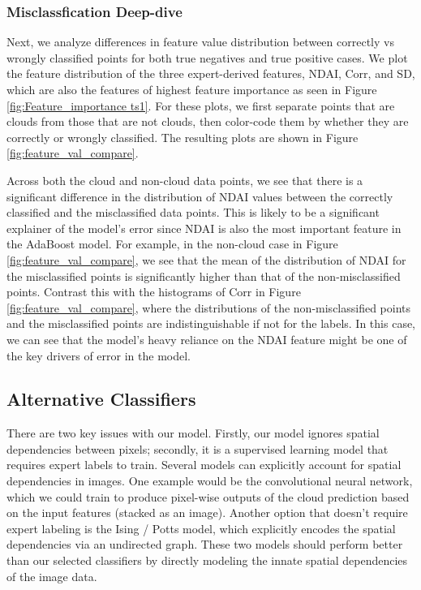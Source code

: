 \documentclass[11pt, letterpaper, journal]{IEEEtran}
\begin{document}
\subsubsection{Misclassfication Deep-dive}
Next, we analyze differences in feature value distribution between correctly vs wrongly classified points for both true negatives and true positive cases. We plot the feature distribution of the three expert-derived features, NDAI, Corr, and SD, which are also the features of highest feature importance as seen in Figure \ref{fig:Feature_importance ts1}. For these plots, we first separate points that are clouds from those that are not clouds, then color-code them by whether they are correctly or wrongly classified. The resulting plots are shown in Figure \ref{fig:feature_val_compare}.

Across both the cloud and non-cloud data points, we see that there is a significant difference in the distribution of NDAI values between the correctly classified and the misclassified data points. This is likely to be a significant explainer of the model's error since NDAI is also the most important feature in the AdaBoost model. For example, in the non-cloud case in Figure \ref{fig:feature_val_compare}, we see that the mean of the distribution of NDAI for the misclassified points is significantly higher than that of the non-misclassified points. Contrast this with the histograms of Corr in Figure \ref{fig:feature_val_compare}, where the distributions of the non-misclassified points and the misclassified points are indistinguishable if not for the labels. In this case, we can see that the model's heavy reliance on the NDAI feature might be one of the key drivers of error in the model.

\subsection{Alternative Classifiers}
There are two key issues with our model. Firstly, our model ignores spatial dependencies between pixels; secondly, it is a supervised learning model that requires expert labels to train. Several models can explicitly account for spatial dependencies in images. One example would be the convolutional neural network, which we could train to produce pixel-wise outputs of the cloud prediction based on the input features (stacked as an image). Another option that doesn't require expert labeling is the Ising / Potts model, which explicitly encodes the spatial dependencies via an undirected graph. These two models should perform better than our selected classifiers by directly modeling the innate spatial dependencies of the image data.
\end{document}
